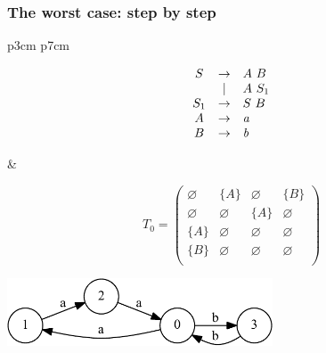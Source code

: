 \documentclass[xcolor=table]{beamer}
\begin{document}
\begin{frame}
  \frametitle{The worst case: step by step}
\begin{tabular}{p{3cm} p{7cm} }
\begin{figure}[h]
   \[
\begin{array}{ccl}
    S & \rightarrow & A \ B \\
      & | & A \ S_1 \\
    S_1 & \rightarrow & S \ B \\
    A & \rightarrow & \text{\emph{a}} \\
    B & \rightarrow & \text{\emph{b}} \\
\end{array}
\]
\label{ProductionRulesExampleQueryCNF}
\end{figure}

&

\begin{figure}[h]
\[
T_0 = \begin{pmatrix}
    \varnothing & \{A\}       & \varnothing & \{B\}       \\
    \varnothing & \varnothing & \{A\}       & \varnothing \\
    \{A\}       & \varnothing & \varnothing & \varnothing \\
    \{B\}       & \varnothing & \varnothing & \varnothing \\
\end{pmatrix}
\]

\end{figure}
 \end{tabular}

\begin{center}
  \includegraphics[height=2cm]{pictures/example_graph.pdf}
\end{center}

\end{frame}
\end{document}

